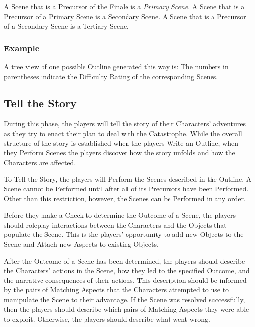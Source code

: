 \documentclass[12pt, a5paper, parskip=half-]{scrartcl}
\begin{document}
A Scene that is a Precursor of the Finale is a \emph{Primary Scene}.
A Scene that is a Precursor of a Primary Scene is a {Secondary Scene}.
A Scene that is a Precursor of a Secondary Scene is a {Tertiary Scene}.

\newpage

\subsubsection*{Example}

A tree view of one possible Outline generated this way is:
\medskip
{}
The numbers in parentheses indicate the Difficulty Rating of the corresponding Scenes.

\newpage

\subsection*{Tell the Story}
During this phase, the players will tell the story of their Characters' adventures as they try to enact their plan to deal with the Catastrophe.
While the overall structure of the story is established when the players Write an Outline, when they Perform Scenes the players discover how the story unfolds and how the Characters are affected.

To Tell the Story, the players will Perform the Scenes described in the Outline.
A Scene cannot be Performed until after all of its Precursors have been Performed. Other than this restriction, however, the Scenes can be Performed in any order.

Before they make a Check to determine the Outcome of a Scene, the players should roleplay interactions between the Characters and the Objects that populate the Scene.
This is the players' opportunity to add new Objects to the Scene and Attach new Aspects to existing Objects.

After the Outcome of a Scene has been determined, the players should describe the Characters' actions in the Scene, how they led to the specified Outcome, and the narrative consequences of their actions.
This description should be informed by the pairs of Matching Aspects that the Characters attempted to use to manipulate the Scene to their advantage.
If the Scene was resolved successfully, then the players should describe which pairs of Matching Aspects they were able to exploit.
Otherwise, the players should describe what went wrong.
\end{document}
